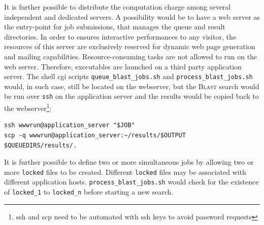 \documentclass[USenglish]{scrartcl}
\newcommand{\noun}[1]{\textsc{#1}}
\begin{document}
It is further possible to distribute the computation charge among several independent and dedicated servers. A possibility would be to have a web server as  the entry-point for job submissions, that manages the queue and result directories. In order to ensures interactive performances to any visitor, the resources of this server are exclusively reserved for dynamic web page generation and mailing capabilities. Resource-consuming tasks are not allowed to run on the web server. Therefore, executables are launched on a third party application server. The shell cgi scripts \texttt{queue\_blast\_jobs.sh} and \texttt{process\_blast\_jobs.sh} would, in such case, still be located on the webserver, but the \noun{Blast} search would be run over \texttt{ssh} on the application server and the results would be copied back to the webserver\footnote{ssh and scp need to be automated with ssh keys to avoid password requests}:

\begin{verbatim}
ssh wwwrun@application_server "$JOB"
scp -q wwwrun@application_server:~/results/$OUTPUT  $QUEUEDIRS/results/.
\end{verbatim}

It is further possible to define two or more simultaneous jobs by allowing two or more \texttt{locked} files to be created. Different \texttt{locked} files may be associated with different application hosts. \texttt{process\_blast\_jobs.sh} would check for the existence of \texttt{locked\_1} to \texttt{locked\_n} before starting a new search.


 

\end{document}
